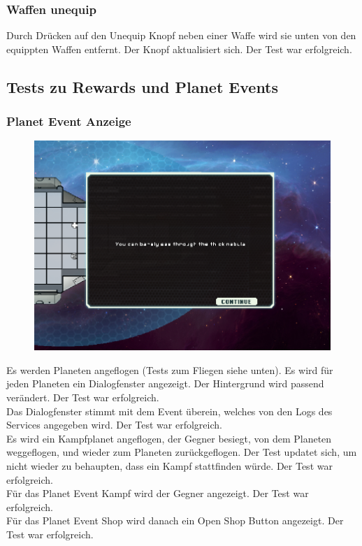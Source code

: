 \documentclass[fontsize=12pt,paper=a4,twoside]{scrartcl}
\begin{document}
\subsubsection{Waffen unequip}
Durch Drücken auf den Unequip Knopf neben einer Waffe wird sie unten von den equippten Waffen entfernt. Der Knopf aktualisiert sich. Der Test war erfolgreich. \\



\subsection{Tests zu Rewards und Planet Events}
\subsubsection{Planet Event Anzeige}
\begin{figure}[h!]
\centering
\includegraphics[width=0.5\linewidth]{images/event.png}
\end{figure}
Es werden Planeten angeflogen (Tests zum Fliegen siehe unten). Es wird für jeden Planeten ein Dialogfenster angezeigt. Der Hintergrund wird passend verändert. Der Test war erfolgreich. \\
Das Dialogfenster stimmt mit dem Event überein, welches von den Logs des Services angegeben wird. Der Test war erfolgreich. \\
Es wird ein Kampfplanet angeflogen, der Gegner besiegt, von dem Planeten weggeflogen, und wieder zum Planeten zurückgeflogen. Der Test updatet sich, um nicht wieder zu behaupten, dass ein Kampf stattfinden würde. Der Test war erfolgreich. \\
Für das Planet Event Kampf wird der Gegner angezeigt. Der Test war erfolgreich. \\
Für das Planet Event Shop wird danach ein Open Shop Button angezeigt. Der Test war erfolgreich. \\
\end{document}
